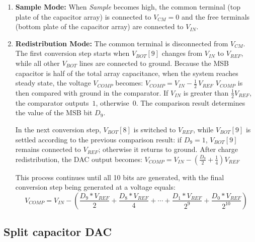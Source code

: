 \begin{enumerate}
	\item \textbf{Sample Mode:} When \textit{Sample} becomes high, the common terminal 
	(top plate of the capacitor array) is connected to $V_{CM} = 0$ and the free 
	terminals (bottom plate of the capacitor array) are connected to $V_{IN}$.
	
	\item \textbf{Redistribution Mode:} The common terminal is disconnected from 
	$V_{CM}$. The first conversion step starts when $V_{BOT}[9]$ changes from 
	$V_{IN}$ to $V_{REF}$, while all other $V_{BOT}$ lines are connected to ground. 
	Because the MSB capacitor is half of the total array capacitance, when the 
	system reaches steady state, the voltage $V_{COMP}$ becomes:
		$V_{COMP} = V_{IN} - \frac{1}{2}\,V_{REF}$
	$V_{COMP}$ is then compared with ground in the comparator. If $V_{IN}$ is 
	greater than $\frac{1}{2}V_{REF}$, the comparator outputs~$1$, otherwise~$0$. 
	The comparison result determines the value of the MSB bit $D_9$.
	
	In the next conversion step, $V_{BOT}[8]$ is switched to $V_{REF}$, while 
	$V_{BOT}[9]$ is settled according to the previous comparison result: if $D_9 = 1$, 
	$V_{BOT}[9]$ remains connected to $V_{REF}$; otherwise it returns to ground. 
	After charge redistribution, the DAC output becomes:
	$V_{COMP} = V_{IN} - \left(\frac{D_9}{2} + \frac{1}{4}\right)V_{REF}$

This process continues until all 10 bits are generated, with the final conversion step being generated at a voltage equals:
\begin{equation}
	V_{COMP} =V_{IN} - (
	\frac{D_9*V_{REF}}{2} 
	+ \frac{D_8 * V_{REF}}{4} 
	+ \cdots 
	+ \frac{D_1 * V_{REF}}{2^9} 
	+ \frac{D_0 * V_{REF}}{2^{10}})
\end{equation}
\end{enumerate}


\subsection{Split capacitor DAC}



